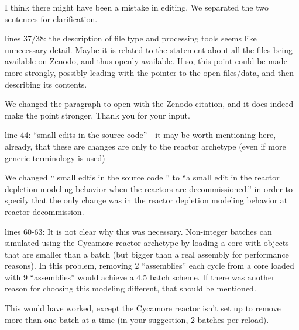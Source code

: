 \documentclass[answers,11pt]{exam}
\begin{document}
\begin{questions}
        \begin{solution}
        I think there might have been a mistake in editing.
        We separated the two sentences for clarification.
        \end{solution}

        \question lines 37/38: the description of file type and processing 
        tools seems like unnecessary detail.  Maybe it is related to the 
        statement about all the files being available on Zenodo, and thus 
        openly available.  If so, this point could be made more strongly, 
        possibly leading with the pointer to the open files/data, and then 
        describing its contents.

        \begin{solution}
        We changed the paragraph to open with the Zenodo citation, and
        it does indeed make the point stronger. Thank you for your input.
        \end{solution}

        \question line 44: ``small edits in the source code'' - it may be worth 
        mentioning here, already, that these are changes are only to the 
        reactor archetype (even if more generic terminology is used)

        \begin{solution}
        We changed
        `` small edtis in the source code '' to ``a small edit in the reactor depletion modeling behavior
        when the reactors are decommissioned.'' in order to specify that the only
        change was in the reactor depletion modeling behavior at reactor decommission.
        \end{solution}

        \question lines 60-63: It is not clear why this was necessary. 
        Non-integer batches can simulated using the Cycamore reactor archetype 
        by loading a core with objects that are smaller than a batch (but 
        bigger than a real assembly for performance reasons).  In this problem, 
        removing 2 ``assemblies'' each cycle from a core loaded with 9 
        ``assemblies'' would achieve a 4.5 batch scheme.  If there was another 
        reason for choosing this modeling different, that should be mentioned.

        \begin{solution}
                This would have worked, except the Cycamore reactor isn't set 
                up to remove more than one batch at a time (in your suggestion, 
                2 batches per reload). 
        \end{solution}


\end{questions}
\end{document}

